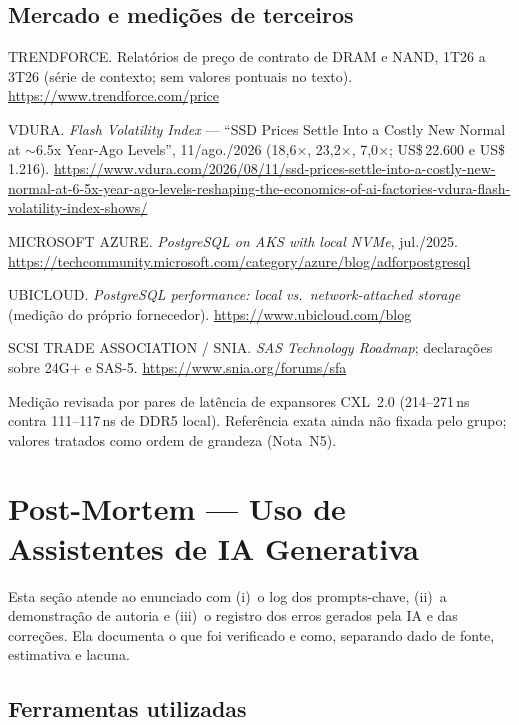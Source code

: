 \documentclass[11pt,a4paper]{article}
\begin{document}
\subsection*{Mercado e medições de terceiros}
\begin{enumerate}[label={[\arabic*]},leftmargin=*,start=29]
\item TRENDFORCE. Relatórios de preço de contrato de DRAM e NAND, 1T26 a 3T26 (série de
      contexto; sem valores pontuais no texto). \url{https://www.trendforce.com/price}
\item VDURA. \emph{Flash Volatility Index} --- ``SSD Prices Settle Into a Costly New Normal at
      $\sim$6.5x Year-Ago Levels'', 11/ago./2026 (18,6$\times$, 23,2$\times$, 7,0$\times$;
      US\$\,22.600 e US\$\,1.216).
      \url{https://www.vdura.com/2026/08/11/ssd-prices-settle-into-a-costly-new-normal-at-6-5x-year-ago-levels-reshaping-the-economics-of-ai-factories-vdura-flash-volatility-index-shows/}
\item MICROSOFT AZURE. \emph{PostgreSQL on AKS with local NVMe}, jul./2025.
      \url{https://techcommunity.microsoft.com/category/azure/blog/adforpostgresql}
\item UBICLOUD. \emph{PostgreSQL performance: local vs.\ network-attached storage} (medição do
      próprio fornecedor). \url{https://www.ubicloud.com/blog}
\item SCSI TRADE ASSOCIATION / SNIA. \emph{SAS Technology Roadmap}; declarações sobre 24G$+$ e
      SAS-5. \url{https://www.snia.org/forums/sfa}
\item Medição revisada por pares de latência de expansores CXL~2.0 (214--271\,ns contra
      111--117\,ns de DDR5 local). Referência exata ainda não fixada pelo grupo; valores
      tratados como ordem de grandeza (Nota~N5).
\end{enumerate}
\endgroup

\clearpage
\section{Post-Mortem --- Uso de Assistentes de IA Generativa}

Esta seção atende ao enunciado com (i)~o log dos prompts-chave, (ii)~a demonstração de
autoria e (iii)~o registro dos erros gerados pela IA e das correções. Ela documenta o que foi
verificado e como, separando dado de fonte, estimativa e lacuna.

\subsection{Ferramentas utilizadas}
\end{document}
